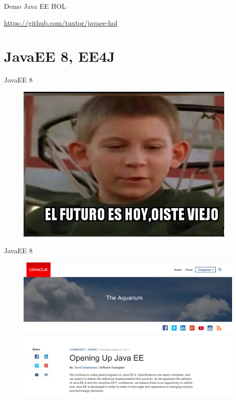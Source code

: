 \documentclass{beamer}
\begin{document}
\begin{frame}{Demo}
Java EE HOL

\url{https://github.com/tuxtor/javaee-hol}

\end{frame}




\section{JavaEE 8, EE4J}

\begin{frame}{JavaEE 8}
\begin{figure}
	\centering
	\includegraphics[width=0.6\linewidth]{Images/futuro}
\end{figure}
\end{frame}

\begin{frame}{JavaEE 8}
\begin{figure}
	\centering
	\includegraphics[width=\linewidth]{Images/javaeeopen}
\end{figure}
\end{frame}
\end{document}
